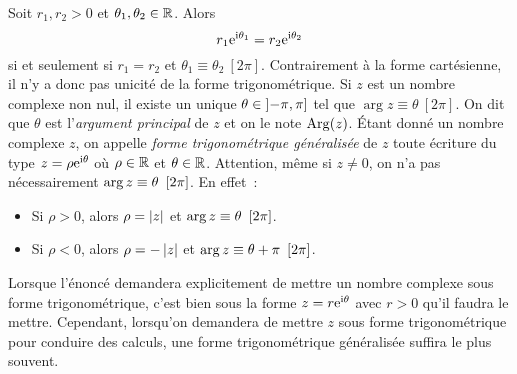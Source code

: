 \documentclass{magnoliaold}
\begin{document}
\begin{remarques}
\remarque Soit $r_1,r_2>0$ et $\theta_1,\theta_2\in\mathbb{R}$. Alors
  \[r_1{\rm e}^{{\rm i}\theta_1}=r_2{\rm e}^{{\rm i}\theta_2}\]
  si et seulement si $r_1=r_2$ et $\theta_1\equiv\theta_2\ [2\pi]$. Contrairement à la forme cartésienne, il n'y a donc pas unicité de la forme trigonométrique.
\remarque Si $z$ est un nombre complexe non nul, il existe un unique
  $\theta\in\left]-\pi,\pi\right]$ tel que $\arg z\equiv \theta\ [2\pi]$.
  On dit que $\theta$ est l'\emph{argument principal} de $z$ et on le note
  $\operatorname{Arg}(z)$.
\remarque Étant donné un nombre complexe $z$, on appelle
   {\it forme trigonométrique généralisée} de $z$ toute écriture du type
    $z=\rho {\rm e}^{{\rm i}\theta}$ où $\rho\in\mathbb{R}$ et $\theta\in\mathbb{R}$. Attention, même si $z\neq 0$, on n'a pas nécessairement
    $\arg{z}\equiv\theta\ \left[2\pi\right]$. En effet~:
    \begin{itemize}
    \item {Si $\rho>0$}, alors $\rho=\left|z\right|$ et
      $\arg{z}\equiv\theta\ \left[2\pi\right]$.
    \item {Si $\rho<0$}, alors $\rho=-\left|z\right|$ et
      $\arg{z}\equiv\theta+\pi\ \cro{2\pi}$.
    \end{itemize}
  Lorsque l'énoncé demandera explicitement
  de mettre un nombre complexe sous forme trigonométrique, c'est bien
  sous la forme $z=r {\rm e}^{{\rm i}\theta}$ avec $r>0$ qu'il faudra le mettre.
  Cependant, lorsqu'on demandera de mettre $z$ sous forme trigonométrique pour
  conduire des calculs, une forme trigonométrique généralisée suffira le plus
  souvent.
\end{remarques}
\end{document}
